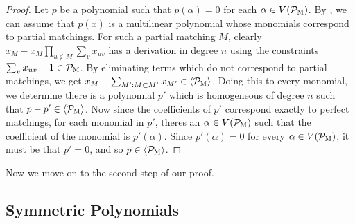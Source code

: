 \begin{proof}
Let $p$ be a polynomial such that $p(\alpha) = 0$ for each $\alpha \in V(\mathcal P_{\textsc{M}})$. By , we can assume that $p(x)$ is a multilinear polynomial whose monomials correspond to partial matchings. For such a partial matching $M$, clearly $x_M - x_M\prod_{u \notin M} \sum_v x_{uv}$ has a derivation in degree $n$ using the constraints $\sum_v x_{uv} - 1 \in \mathcal P_{\textsc{M}}$. By eliminating terms which do not correspond to partial matchings, we get $x_M - \sum_{M': M \subset M'} x_{M'} \in \langle \mathcal P_{\textsc{M}} \rangle$. Doing this to every monomial, we determine there is a polynomial $p'$ which is homogeneous of degree $n$ such that $p - p' \in \langle \mathcal P_{\textsc{M}} \rangle$. Now since the coefficients of $p'$ correspond exactly to perfect matchings, for each monomial in $p'$, theres an $\alpha \in V(\mathcal P_{\textsc{M}})$ such that the coefficient of the monomial is $p'(\alpha)$. Since $p'(\alpha) = 0$ for every $\alpha \in V(\mathcal P_{\textsc{M}})$, it must be that $p' = 0$, and so $p \in \langle \mathcal P_{\textsc{M}} \rangle$.
\end{proof}
Now we move on to the second step of our proof. 

\subsection{Symmetric Polynomials}

